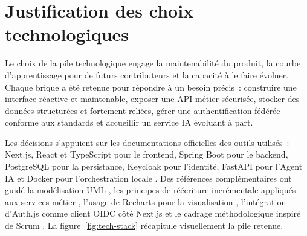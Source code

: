 \documentclass[12pt,a4paper]{report}
\begin{document}
\section{Justification des choix technologiques}
Le choix de la pile technologique engage la maintenabilité du produit, la courbe d'apprentissage pour de futurs contributeurs et la capacité à le faire évoluer. Chaque brique a été retenue pour répondre à un besoin précis~: construire une interface réactive et maintenable, exposer une API métier sécurisée, stocker des données structurées et fortement reliées, gérer une authentification fédérée conforme aux standards et accueillir un service IA évoluant à part.

Les décisions s'appuient sur les documentations officielles des outils utilisés~: Next.js, React et TypeScript pour le frontend, Spring Boot pour le backend, PostgreSQL pour la persistance, Keycloak pour l'identité, FastAPI pour l'Agent IA et Docker pour l'orchestration locale \cite{nextjs,react,typescript,springboot,keycloak,postgresql,fastapi,docker}. Des références complémentaires ont guidé la modélisation UML \cite{larman2012}, les principes de réécriture incrémentale appliqués aux services métier \cite{fowler2018}, l'usage de Recharts pour la visualisation \cite{recharts}, l'intégration d'Auth.js comme client OIDC côté Next.js \cite{authjs} et le cadrage méthodologique inspiré de Scrum \cite{scrum}. La figure~\ref{fig:tech-stack} récapitule visuellement la pile retenue.
\end{document}
